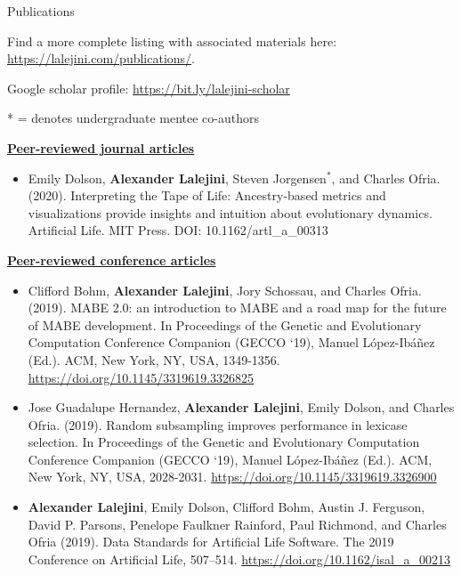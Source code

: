 \begin{rSection}{Publications}

Find a more complete listing with associated materials here: \url{https://lalejini.com/publications/}.

Google scholar profile: \url{https://bit.ly/lalejini-scholar}

* = denotes undergraduate mentee co-authors

\underline{\large {\bf Peer-reviewed journal articles}}

\begin{itemize}
  \item Emily Dolson, \textbf{Alexander Lalejini}, Steven Jorgensen$^{*}$, and Charles Ofria. (2020).
  Interpreting the Tape of Life: Ancestry-based metrics and visualizations provide insights and intuition about evolutionary dynamics.
  Artificial Life. MIT Press. DOI: 10.1162/artl\_a\_00313
\end{itemize}

\underline{\large {\bf Peer-reviewed conference articles}}

\begin{itemize}

\item Clifford Bohm, \textbf{Alexander Lalejini}, Jory Schossau, and Charles Ofria. (2019).
MABE 2.0: an introduction to MABE and a road map for the future of MABE development.
In Proceedings of the Genetic and Evolutionary Computation Conference Companion (GECCO ‘19), Manuel López-Ibáñez (Ed.). ACM, New York, NY, USA, 1349-1356.
\url{https://doi.org/10.1145/3319619.3326825}

\item Jose Guadalupe Hernandez, \textbf{Alexander Lalejini}, Emily Dolson, and Charles Ofria. (2019).
Random subsampling improves performance in lexicase selection.
In Proceedings of the Genetic and Evolutionary Computation Conference Companion (GECCO ‘19), Manuel López-Ibáñez (Ed.). ACM, New York, NY, USA, 2028-2031.
\url{https://doi.org/10.1145/3319619.3326900}

\item \textbf{Alexander Lalejini}, Emily Dolson, Clifford Bohm, Austin J. Ferguson, David P. Parsons, Penelope Faulkner Rainford, Paul Richmond, and Charles Ofria (2019).
Data Standards for Artificial Life Software.
The 2019 Conference on Artificial Life, 507–514.
\url{https://doi.org/10.1162/isal_a_00213}


\end{itemize}
\end{rSection}
